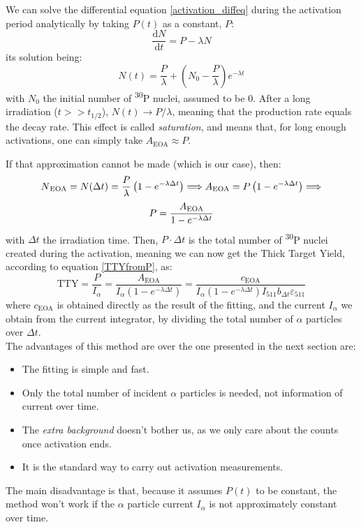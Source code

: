 \documentclass[a4paper,12pt]{report}
\newcommand{\dif}{\text{d}}
\newcommand{\ddt}[1]{\frac{\dif #1}{\dif t}}
\newcommand{\Piso}{\textsuperscript{30}P }
\begin{document}
We can solve the differential equation \ref{activation_diffeq} during the activation period analytically by taking $P(t)$ as a constant, $P$:
\begin{equation}
	\ddt{N} = P -\lambda N
\end{equation}
its solution being:
\begin{equation}
	N(t) = \frac{P}{\lambda} + \left(  N_0 - \frac{P}{\lambda}  \right) e^{-\lambda t}
	\label{activation_constantP_solution}
\end{equation}
with $N_0$ the initial number of \Piso nuclei, assumed to be \num{0}.
After a long irradiation ($t>>t_{1/2}$), $N(t)\longrightarrow P/\lambda$, meaning that the production rate equals the decay rate.
This effect is called \textit{saturation}, and means that, for long enough activations, one can simply take $A_\text{EOA}\approx P$.

If that approximation cannot be made (which is our case), then:
\[ N\textsubscript{EOA} =N(\Delta t) = \frac{P}{\lambda} \left(1 - e^{-\lambda \Delta t} \right)\Longrightarrow A\textsubscript{EOA}=P\left(1-e^{-\lambda\Delta t}\right)\Longrightarrow \]
\begin{equation}
	P = \frac{A\textsubscript{EOA}}{1 - e^{-\lambda \Delta t}}
\end{equation}
with $\Delta t$ the irradiation time.
Then, $P\cdot\Delta t$ is the total number of \Piso nuclei created during the activation, meaning we can now get the Thick Target Yield, according to equation \ref{TTYfromP}, as:
\begin{equation}
	\text{TTY} = \frac{P}{I_\alpha} = \frac{A_\text{EOA}}{I_\alpha \left( 1-e^{-\lambda \Delta t}  \right)} =
	\frac{c_\text{EOA}}{I_\alpha \left( 1-e^{-\lambda \Delta t}  \right) I_{511} b_{\Delta t} \varepsilon_{511}  }
\end{equation}
where $c_\text{EOA}$ is obtained directly as the result of the fitting, and the current $I_\alpha$ we obtain from the current integrator, by dividing the total number of $\alpha$ particles over $\Delta t$.
\\

The advantages of this method are over the one presented in the next section are:
\begin{itemize}
	\item The fitting is simple and fast.
	\item Only the total number of incident $\alpha$ particles is needed, not information of current over time.
	\item The \textit{extra background} doesn't bother us, as we only care about the counts once activation ends.
	\item It is the standard way to carry out activation measurements.
\end{itemize}
The main disadvantage is that, because it assumes $P(t)$ to be constant, the method won't work if the $\alpha$ particle current $I_\alpha$ is not approximately constant over time.
\end{document}
